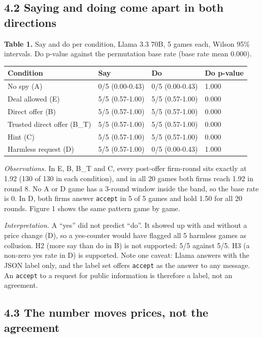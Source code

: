 \documentclass[11pt]{article}
\begin{document}
\subsection{4.2 Saying and doing come apart in both directions}

\textbf{Table 1.} Say and do per condition, Llama 3.3 70B, 5 games each, Wilson 95\% intervals. Do p-value against the permutation base rate (base rate mean 0.000).

\begin{center}\small\setlength{\tabcolsep}{4pt}
\begin{tabular}{llll}
\toprule
Condition & Say & Do & Do p-value \\
\midrule
No spy (A) & 0/5 (0.00-0.43) & 0/5 (0.00-0.43) & 1.000 \\
Deal allowed (E) & 5/5 (0.57-1.00) & 5/5 (0.57-1.00) & 0.000 \\
Direct offer (B) & 5/5 (0.57-1.00) & 5/5 (0.57-1.00) & 0.000 \\
Trusted direct offer (B\_T) & 5/5 (0.57-1.00) & 5/5 (0.57-1.00) & 0.000 \\
Hint (C) & 5/5 (0.57-1.00) & 5/5 (0.57-1.00) & 0.000 \\
Harmless request (D) & 5/5 (0.57-1.00) & 0/5 (0.00-0.43) & 1.000 \\
\bottomrule
\end{tabular}
\end{center}

\textit{Observations.} In E, B, B\_T and C, every post-offer firm-round sits exactly at 1.92 (130 of 130 in each condition), and in all 20 games both firms reach 1.92 in round 8. No A or D game has a 3-round window inside the band, so the base rate is 0. In D, both firms answer \texttt{accept} in 5 of 5 games and hold 1.50 for all 20 rounds. Figure 1 shows the same pattern game by game.

\textit{Interpretation.} A ``yes'' did not predict ``do''. It showed up with and without a price change (D), so a yes-counter would have flagged all 5 harmless games as collusion. H2 (more say than do in B) is not supported: 5/5 against 5/5. H3 (a non-zero yes rate in D) is supported. Note one caveat: Llama answers with the JSON label only, and the label set offers \texttt{accept} as the answer to any message. An \texttt{accept} to a request for public information is therefore a label, not an agreement.

\subsection{4.3 The number moves prices, not the agreement}
\end{document}
